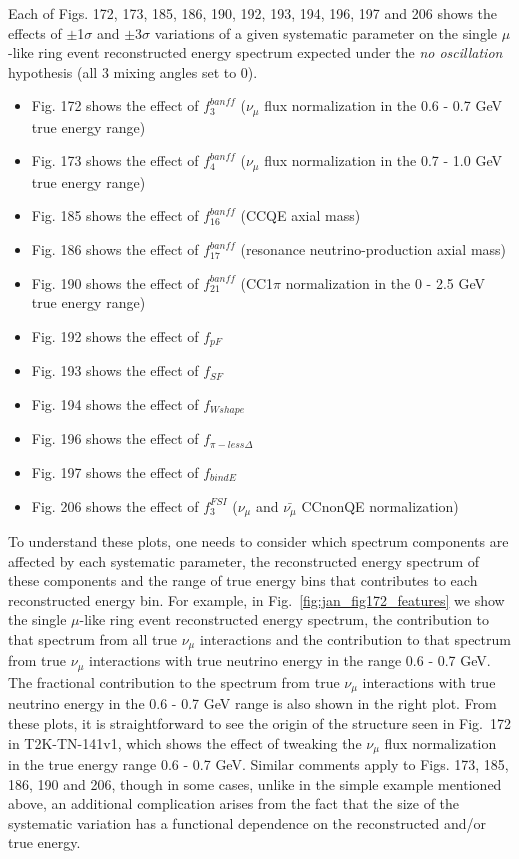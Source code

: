 \begin{enumerate}
Each of Figs. 172, 173, 185, 186, 190, 192, 193, 194, 196, 197 and 206
shows the effects of $\pm$1$\sigma$ and $\pm$3$\sigma$ variations
of a given systematic parameter on the 
single $\mu$-like ring event reconstructed energy spectrum 
expected under the {\em no oscillation} hypothesis (all 3 mixing angles set to 0).
\begin{itemize}
\item
Fig. 172 shows the effect of $f_{3}^{banff}$ ($\nu_{\mu}$ flux normalization in the 0.6 - 0.7 GeV true energy range)
\item
Fig. 173 shows the effect of $f_{4}^{banff}$ ($\nu_{\mu}$ flux normalization in the 0.7 - 1.0 GeV true energy range)
\item
Fig. 185 shows the effect of $f_{16}^{banff}$ (CCQE axial mass)
\item
Fig. 186 shows the effect of $f_{17}^{banff}$ (resonance neutrino-production axial mass)
\item
Fig. 190 shows the effect of $f_{21}^{banff}$ (CC1$\pi$ normalization in the 0 - 2.5 GeV true energy range)
\item
Fig. 192 shows the effect of $f_{pF}$
\item
Fig. 193 shows the effect of $f_{SF}$
\item
Fig. 194 shows the effect of $f_{Wshape}$
\item
Fig. 196 shows the effect of $f_{\pi-less\Delta}$
\item
Fig. 197 shows the effect of $f_{bindE}$
\item
Fig. 206 shows the effect of $f_{3}^{FSI}$ ($\nu_{\mu}$ and $\bar{\nu_{\mu}}$ CCnonQE normalization)
\end{itemize}

To understand these plots, one needs to 
consider which spectrum components are affected by each systematic parameter, 
the reconstructed energy spectrum of these components and the range of 
true energy bins that contributes to each reconstructed energy bin.
For example, in Fig.\ \ref{fig:jan_fig172_features}
we show the single $\mu$-like ring event reconstructed energy spectrum,
the contribution to that spectrum from all true $\nu_\mu$ interactions and
the contribution to that spectrum from true $\nu_\mu$ interactions with true neutrino
energy in the range 0.6 - 0.7 GeV. The fractional contribution to the spectrum
from true $\nu_\mu$ interactions with true neutrino
energy in the 0.6 - 0.7 GeV range is also shown in the right plot.
From these plots, it is straightforward to see the origin of the structure seen in Fig.\ 172
in T2K-TN-141v1, which shows the effect of tweaking the 
$\nu_{\mu}$ flux normalization in the true energy range 0.6 - 0.7 GeV.
Similar comments apply to Figs. 173, 185, 186, 190 and 206,
though in some cases, unlike in the simple example mentioned above, 
an additional complication arises from the  fact that
the size of the systematic variation has a functional dependence on the reconstructed and/or true energy.


\end{enumerate}
